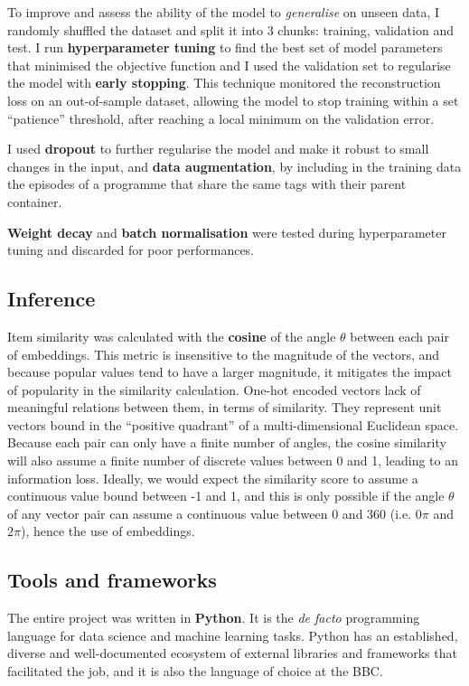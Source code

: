 To improve and assess the ability of the model to \textit{generalise} on unseen data, I randomly shuffled the dataset and split
it into 3 chunks: training, validation and test. I run \textbf{hyperparameter tuning} to find the best set of model parameters
that minimised the objective function and I used the validation set to regularise the model with \textbf{early stopping}.
This technique monitored the reconstruction loss on an out-of-sample dataset,
allowing the model to stop training within a set ``patience'' threshold, after reaching a local minimum on the validation error.

I used \textbf{dropout} to further regularise the model and make it robust to small changes in the input,
and \textbf{data augmentation}, by including in the training data the episodes of a programme that share the same tags with their
parent container.

\textbf{Weight decay} and \textbf{batch normalisation} were tested during hyperparameter tuning and discarded for poor performances.

\subsection{Inference}

Item similarity was calculated with the \textbf{cosine} of the angle $\theta$ between each pair of embeddings. This metric
is insensitive to the magnitude of the vectors, and because popular values tend to have a larger magnitude, it mitigates the impact of
popularity in the similarity calculation. One-hot encoded vectors lack of meaningful relations between them, in terms of similarity.
They represent unit vectors bound in the ``positive quadrant'' of a multi-dimensional Euclidean space. Because each pair can only have a finite number of angles,
the cosine similarity will also assume a finite number of discrete values between 0 and 1, leading to an information
loss. Ideally, we would expect the similarity score to assume a continuous value bound between -1 and 1, and this
is only possible if the angle $\theta$ of any vector pair can assume a continuous value between 0 and 360 (i.e. $0\pi$ and $2\pi$), hence
the use of embeddings.

\subsection{Tools and frameworks}

The entire project was written in \textbf{Python}. It is the \textit{de facto} programming language for data science
and machine learning tasks. Python has an established, diverse and well-documented ecosystem of external libraries
and frameworks that facilitated the job, and it is also the language of choice at the BBC.

